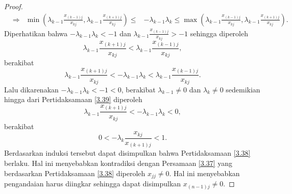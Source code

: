 \begin{proof}
\begin{align*}
         &\Longrightarrow&\min(\lambda_{k-1}\frac{x_{(k-1)j}}{x_{kj}},\lambda_{k-1}\frac{x_{(k+1)j}}{x_{kj}}) \leq & -\lambda_{k-1}\lambda_{k} \leq \max(\lambda_{k-1}\frac{x_{(k-1)j}}{x_{kj}},\lambda_{k-1}\frac{x_{(k+1)j}}{x_{kj}}).
    \end{align*}
    Diperhatikan bahwa $-\lambda_{k-1}\lambda_{k} < -1$ dan $\lambda_{k-1}\frac{x_{(k-1)j}}{x_{kj}} > -1$ sehingga diperoleh 
    \begin{equation*}
        \lambda_{k-1}\frac{x_{(k+1)j}}{x_{kj}} < \lambda_{k-1}\frac{x_{(k-1)j}}{x_{kj}},
    \end{equation*}
    berakibat
    \begin{equation}\label{3.39}
        \lambda_{k-1}\frac{x_{(k+1)j}}{x_{kj}} < -\lambda_{k-1}\lambda_{k} < \lambda_{k-1}\frac{x_{(k-1)j}}{x_{kj}}.
    \end{equation}
    Lalu dikarenakan $-\lambda_{k-1}\lambda_{k} < -1 < 0$, berakibat $\lambda_{k-1} \neq 0$ dan $\lambda_{k} \neq 0$ sedemikian hingga dari Pertidaksamaan \eqref{3.39} diperoleh
    \begin{equation*}
        \lambda_{k-1}\frac{x_{(k+1)j}}{x_{kj}} < -\lambda_{k-1}\lambda_{k} < 0,
    \end{equation*}
    berakibat
    \begin{equation*}
        0 < -\lambda_{k}\frac{x_{kj}}{x_{(k+1)j}} < 1.
    \end{equation*}
    Berdasarkan induksi tersebut dapat disimpulkan bahwa Pertidaksamaan \eqref{3.38} berlaku. Hal ini menyebabkan kontradiksi dengan Persamaan \eqref{3.37} yang berdasarkan Pertidaksamaan \eqref{3.38} diperoleh $x_{jj} \neq 0$. Hal ini menyebabkan pengandaian harus diingkar sehingga dapat disimpulkan $x_{(n-1)j} \neq 0$.


\end{proof}
